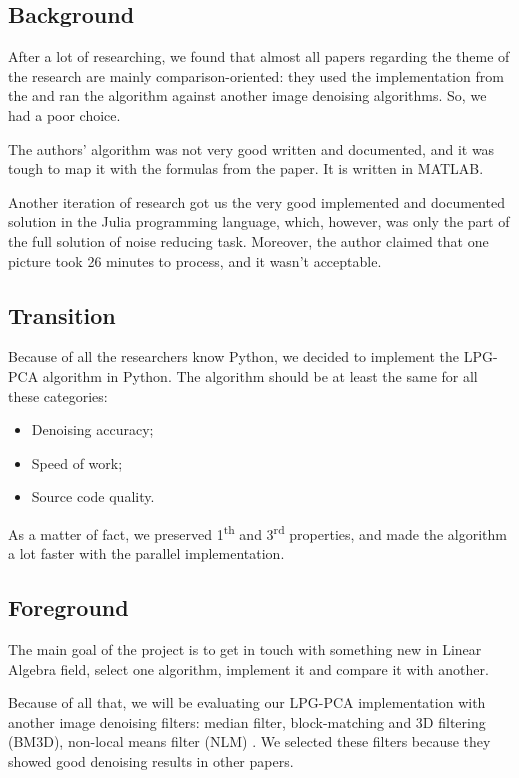 \subsection{Background}
After a lot of researching, we found that almost all papers regarding the theme of the research are mainly comparison-oriented: they used the implementation from the \cite{zhang2010two} and ran the algorithm against another image denoising algorithms. So, we had a poor choice.

The authors’ algorithm was not very good written and documented, and it was tough to map it with the formulas from the paper. It is written in MATLAB. 

Another iteration of research got us the very good implemented and documented solution\cite{image_denoising} in the Julia programming language, which, however, was only the part of the full solution of noise reducing task. Moreover, the author claimed that one picture took 26 minutes to process, and it wasn’t acceptable.

\subsection{Transition}
Because of all the researchers know Python, we decided to implement the LPG-PCA algorithm in Python. The algorithm should be at least the same for all these categories:
\begin{itemize}
    \item Denoising accuracy;
    \item Speed of work;
    \item Source code quality.
\end{itemize}
As a matter of fact, we preserved 1\textsuperscript{th} and 3\textsuperscript{rd} properties, and made the algorithm a lot faster with the parallel implementation.

\subsection{Foreground}
The main goal of the project is to get in touch with something new in Linear Algebra field, select one algorithm, implement it and compare it with another. 

Because of all that, we will be evaluating our LPG-PCA implementation with another image denoising filters: median filter, block-matching and 3D filtering (BM3D)\cite{dabov2006image}, non-local means filter (NLM) \cite{buades2005non}. We selected these filters because they showed good denoising results in other papers. 

